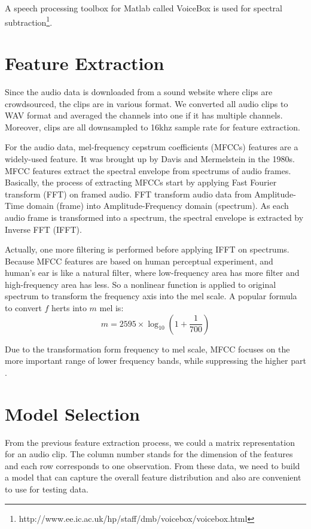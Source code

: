 A speech processing toolbox for Matlab called VoiceBox is used for spectral subtraction\footnote{http://www.ee.ic.ac.uk/hp/staff/dmb/voicebox/voicebox.html}.

\section{Feature Extraction}
Since the audio data is downloaded from a sound website where clips are crowdsourced, the clips are in various format. 
We converted all audio clips to WAV format and averaged the channels into one if it has multiple channels. 
Moreover, clips are all downsampled to 16khz sample rate for feature extraction. 

For the audio data, mel-frequency cepstrum coefficients (MFCCs) features are a widely-used feature. 
It was brought up by Davis and Mermelstein in the 1980s. 
MFCC features extract the spectral envelope from spectrums of audio frames.
Basically, the process of extracting MFCCs start by applying Fast Fourier transform (FFT) on framed audio. 
FFT transform audio data from Amplitude-Time domain (frame) into Amplitude-Frequency domain (spectrum).  
As each audio frame is transformed into a spectrum, the spectral envelope is extracted by Inverse FFT (IFFT).

Actually, one more filtering is performed before applying IFFT on spectrums. 
Because MFCC features are based on human perceptual experiment, and human's ear is like a natural filter, where low-frequency area has more filter and high-frequency area has less. So a nonlinear function is applied to original spectrum to transform the frequency axis into the mel scale. 
A popular formula to convert $f$ herts into $m$ mel is:  
\begin{equation}
	m = 2595 \times \log_{10}(1+\frac{1}{700})
\end{equation} 


Due to the transformation form frequency to mel scale, MFCC focuses on the more important range of lower frequency bands, while suppressing the higher part \cite{davis1980comparison}.

\section{Model Selection}
From the previous feature extraction process, we could a matrix representation for an audio clip. 
The column number stands for the dimension of the features and each row corresponds to one observation. 
From these data, we need to build a model that can capture the overall feature distribution and also are convenient to use for testing data.

